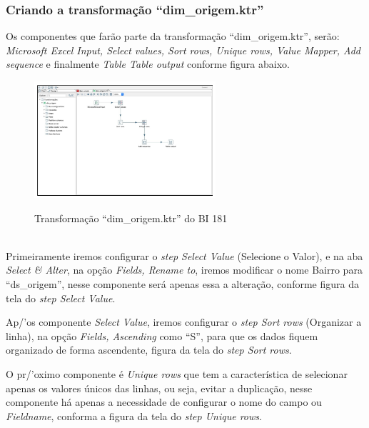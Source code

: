 \subsubsection{Criando a transforma\c{c}\~{a}o ``dim\_origem.ktr''}

Os componentes que farão parte da transformação ``dim\_origem.ktr'', serão: \textit{Microsoft Excel Input, Select values, Sort rows, Unique rows, Value Mapper, Add sequence} e finalmente \textit{Table Table output} conforme figura abaixo. 

\begin{figure}[H]
	\vspace*{0,2cm}
    \centering
    \caption{Transformação ``dim\_origem.ktr'' do BI 181}
    \includegraphics[width=0.6\textwidth]{./04-figuras/figura-dim-origem}
    \label{fig:ilustfigrdimorigem}
\end{figure}
\vspace*{-0,9cm}
{\raggedright {}} \\

Primeiramente iremos configurar o \textit{step Select Value} (Selecione o Valor), e na aba \textit{Select & Alter}, na opção \textit{Fields, Rename to}, iremos modificar o nome Bairro para ``ds\_origem'', nesse componente será apenas essa a alteração, conforme figura da tela do \textit{step Select Value}.

Ap/'{o}s componente \textit{Select Value}, iremos configurar o \textit{step Sort rows} (Organizar a linha), na opção \textit{Fields, Ascending} como ``S'', para que os dados fiquem organizado de forma ascendente, figura da tela do \textit{step Sort rows}.

O pr/'{o}ximo componente é \textit{Unique rows} que tem a característica de selecionar apenas os valores únicos das linhas, ou seja, evitar a duplicação, nesse componente há apenas a necessidade de configurar o nome do campo ou \textit{Fieldname}, conforma a figura da tela do \textit{step Unique rows}.

